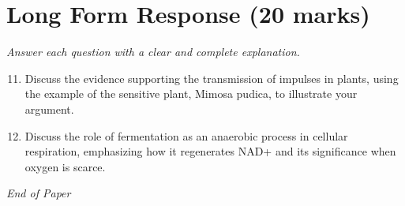 \documentclass[12pt]{article}
\begin{document}
\section*{Long Form Response (20 marks)}
\textit{Answer each question with a clear and complete explanation.}
\begin{enumerate}[label=\arabic*.]
\setcounter{enumi}{10}
\item Discuss the evidence supporting the transmission of impulses in plants, using the example of the sensitive plant, Mimosa pudica, to illustrate your argument.
\item Discuss the role of fermentation as an anaerobic process in cellular respiration, emphasizing how it regenerates NAD+ and its significance when oxygen is scarce.
\end{enumerate}

\vfill
\noindent\textit{End of Paper}
\end{document}
